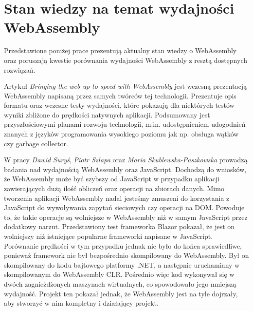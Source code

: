 \documentclass[language=polish,type=master]{aghmodern}
\begin{document}
\section{Stan wiedzy na temat wydajności WebAssembly}
Przedstawione poniżej prace prezentują aktualny stan wiedzy o WebAssembly oraz poruszają kwestie porównania wydajności WebAssembly z resztą dostępnych rozwiązań.

Artykuł \cite{wasm} \emph{Bringing the web up to speed with WebAssembly} jest wczesną prezentacją WebAssembly napisaną przez samych twórców tej technologii.
Prezentuje opis formatu oraz wczesne testy wydajności, które pokazują dla niektórych testów wyniki zbliżone do prędkości natywnych aplikacji.
Podsumowany jest przyszłościowymi planami rozwoju technologii, m.in. udostępnieniem udogodnień znanych z języków programowania wysokiego poziomu jak np. obsługa wątków czy garbage collector\footnotemark{}.

W pracy \cite{wasm_blazor} \emph{Dawid Suryś}, \emph{Piotr Szłapa} oraz \emph{Maria Skublewska-Paszkowska} prowadzą badania nad wydajnością WebAssembly oraz JavaScript.
Dochodzą do wniosków, że WebAssembly może być szybszy od JavaScript w przypadku aplikacji zawierających dużą ilość obliczeń oraz operacji na zbiorach danych.
Mimo tworzenia aplikacji WebAssembly nadal jesteśmy zmuszeni do korzystania z JavaScript do wywoływania zapytań sieciowych czy operacji na DOM\footnotemark{}.
Powoduje to, że takie operacje są wolniejsze w WebAssembly niż w samym JavaScript przez dodatkowy narzut.
Przedstawiony test frameworka Blazor\footnotemark{} pokazał, że jest on wolniejszy niż istniejące popularne frameworki napisane w JavaScript.
Porównanie prędkości w tym przypadku jednak nie było do końca sprawiedliwe, ponieważ framework nie był bezpośrednio skompilowany do WebAssembly.
Był on skompilowany do kodu bajtowego platformy .NET, a następnie uruchamiany w skompilowanym do WebAssembly CLR\footnotemark{}.
Pośrednio więc kod wykonywał się w dwóch zagnieżdżonych maszynach wirtualnych, co spowodowało jego mniejszą wydajność.
Projekt ten pokazał jednak, że WebAssembly jest na tyle dojrzały, aby stworzyć w nim kompletny i działający projekt.
\end{document}
